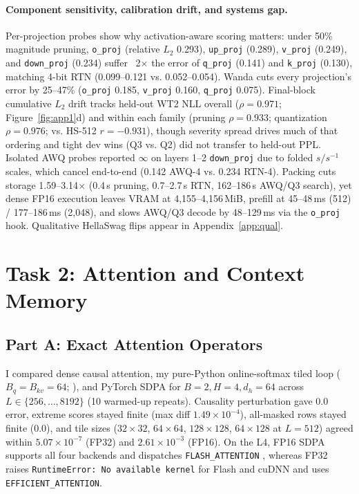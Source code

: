 \documentclass{article}
\begin{document}
\paragraph{Component sensitivity, calibration drift, and systems gap.}
Per-projection probes show why activation-aware scoring matters: under 50\% magnitude pruning, \texttt{o\_proj} (relative $L_2$ 0.293), \texttt{up\_proj} (0.289), \texttt{v\_proj} (0.249), and \texttt{down\_proj} (0.234) suffer ~2$\times$ the error of \texttt{q\_proj} (0.141) and \texttt{k\_proj} (0.130), matching 4-bit RTN (0.099--0.121 vs. 0.052--0.054). Wanda cuts every projection's error by 25--47\% (\texttt{o\_proj} 0.185, \texttt{v\_proj} 0.160, \texttt{q\_proj} 0.075). Final-block cumulative $L_2$ drift tracks held-out WT2 NLL overall ($\rho=0.971$; Figure~\ref{fig:app1}d) and within each family (pruning $\rho=0.933$; quantization $\rho=0.976$; vs. HS-512 $r=-0.931$), though severity spread drives much of that ordering and tight dev wins (Q3 vs. Q2) did not transfer to held-out PPL. Isolated AWQ probes reported $\infty$ on layers 1--2 \texttt{down\_proj} due to folded $s/s^{-1}$ scales, which cancel end-to-end (0.142 AWQ-4 vs. 0.234 RTN-4). Packing cuts storage 1.59--3.14$\times$ (0.4\,s pruning, 0.7--2.7\,s RTN, 162--186\,s AWQ/Q3 search), yet dense FP16 execution leaves VRAM at 4,155--4,156\,MiB, prefill at 45--48\,ms (512) / 177--186\,ms (2,048), and slows AWQ/Q3 decode by 48--129\,ms via the \texttt{o\_proj} hook. Qualitative HellaSwag flips appear in Appendix~\ref{app:qual}.

\section{Task 2: Attention and Context Memory}

\subsection{Part A: Exact Attention Operators}
I compared dense causal attention, my pure-Python online-softmax tiled loop ($B_q=B_{kv}=64$; \citealp{milakov2018online,dao2022flashattention}), and PyTorch SDPA for $B=2, H=4, d_h=64$ across $L\in\{256,\dots,8192\}$ (10 warmed-up repeats). Causality perturbation gave 0.0 error, extreme scores stayed finite (max diff $1.49\times 10^{-4}$), all-masked rows stayed finite (0.0), and tile sizes ($32{\times}32$, $64{\times}64$, $128{\times}128$, $64{\times}128$ at $L=512$) agreed within $5.07\times 10^{-7}$ (FP32) and $2.61\times 10^{-3}$ (FP16). On the L4, FP16 SDPA supports all four backends and dispatches \texttt{FLASH\_ATTENTION} \citep{dao2024flashattention2}, whereas FP32 raises \texttt{RuntimeError: No available kernel} for Flash and cuDNN and uses \texttt{EFFICIENT\_ATTENTION}.
\end{document}
